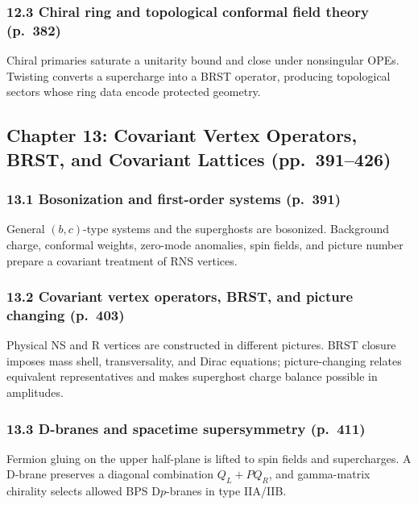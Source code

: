 \documentclass[
  10pt,
  a4paper,
  openany]{book}
\begin{document}
\subsubsection{12.3 Chiral ring and topological conformal field theory
(p.~382)}\label{chiral-ring-and-topological-conformal-field-theory-p.-382}

Chiral primaries saturate a unitarity bound and close under nonsingular
OPEs. Twisting converts a supercharge into a BRST operator, producing
topological sectors whose ring data encode protected geometry.

\subsection{Chapter 13: Covariant Vertex Operators, BRST, and Covariant
Lattices
(pp.~391--426)}\label{chapter-13-covariant-vertex-operators-brst-and-covariant-lattices-pp.-391426}

\subsubsection{13.1 Bosonization and first-order systems
(p.~391)}\label{bosonization-and-first-order-systems-p.-391}

General \((b,c)\)-type systems and the superghosts are bosonized.
Background charge, conformal weights, zero-mode anomalies, spin fields,
and picture number prepare a covariant treatment of RNS vertices.

\subsubsection{13.2 Covariant vertex operators, BRST, and picture
changing
(p.~403)}\label{covariant-vertex-operators-brst-and-picture-changing-p.-403}

Physical NS and R vertices are constructed in different pictures. BRST
closure imposes mass shell, transversality, and Dirac equations;
picture-changing relates equivalent representatives and makes superghost
charge balance possible in amplitudes.

\subsubsection{13.3 D-branes and spacetime supersymmetry
(p.~411)}\label{d-branes-and-spacetime-supersymmetry-p.-411}

Fermion gluing on the upper half-plane is lifted to spin fields and
supercharges. A D-brane preserves a diagonal combination \(Q_L+P Q_R\),
and gamma-matrix chirality selects allowed BPS D\(p\)-branes in type
IIA/IIB.
\end{document}
